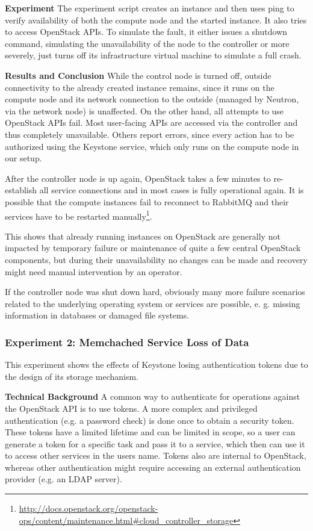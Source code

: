 \textbf{Experiment}
The experiment script creates an instance and then uses ping to verify availability of both the compute node and the started instance. It also tries to access OpenStack APIs. To simulate the fault, it either issues a shutdown command, simulating the unavailability of the node to the controller or more severely, just turns off its infrastructure virtual machine to simulate a full crash.

\textbf{Results and Conclusion}
While the control node is turned off, outside connectivity to the already created instance remains, since it runs on the compute node and its network connection to the outside (managed by Neutron, via the network node) is unaffected. On the other hand, all attempts to use OpenStack APIs fail. Most user-facing APIs are accessed via the controller and thus completely unavailable. Others report errors, since every action has to be authorized using the Keystone service, which only runs on the compute node in our setup.

After the controller node is up again, OpenStack takes a few minutes to re-establish all service connections and in most cases is fully operational again. It is possible that the compute instances fail to reconnect to RabbitMQ and their services have to be restarted manually\footnote{\url{http://docs.openstack.org/openstack-ops/content/maintenance.html\#cloud_controller_storage}}. 

This shows that already running instances on OpenStack are generally not impacted by temporary failure or maintenance of quite a few central OpenStack components, but during their unavailability no changes can be made and recovery might need manual intervention by an operator. 

If the controller node was shut down hard, obviously many more failure scenarios related to the underlying operating system or services are possible, e. g. missing information in databases or damaged file systems.

\subsubsection{Experiment 2: Memchached Service Loss of Data}
This experiment shows the effects of Keystone losing authentication tokens due to the design of its storage mechanism.

\textbf{Technical Background}
A common way to authenticate for operations against the OpenStack API is to use tokens. A more complex and privileged authentication (e.g. a password check) is done once to obtain a security token. These tokens have a limited lifetime and can be limited in scope, so a user can generate a token for a specific task and pass it to a service, which then can use it to access other services in the users name. Tokens also are internal to OpenStack, whereas other authentication might require accessing an external authentication provider (e.g. an LDAP server).

